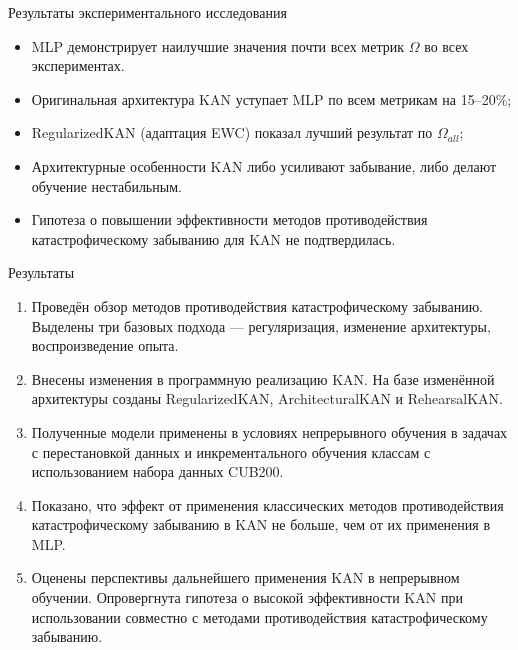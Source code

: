 \documentclass{beamer}
\begin{document}
\begin{frame}{Результаты экспериментального исследования}
  \begin{itemize}
    \item MLP демонстрирует наилучшие значения почти всех метрик $\Omega$ во всех экспериментах.
    \item Оригинальная архитектура KAN уступает MLP по всем метрикам на 15--20\%;
    \item RegularizedKAN (адаптация EWC) показал лучший результат по $\Omega_{all}$;
    \item Архитектурные особенности KAN либо усиливают забывание, либо делают обучение нестабильным.
    \item Гипотеза о повышении эффективности методов противодействия катастрофическому забыванию для KAN не подтвердилась.
  \end{itemize}
\end{frame}


\begin{frame}{Результаты}
  \begin{enumerate}
    \item Проведён обзор методов противодействия катастрофическому забыванию.
        Выделены три базовых подхода — регуляризация, изменение архитектуры, воспроизведение опыта.
    \item Внесены изменения в программную реализацию KAN. На базе изменённой архитектуры
        созданы RegularizedKAN, ArchitecturalKAN и RehearsalKAN.
    \item Полученные модели применены в условиях непрерывного обучения в задачах с перестановкой данных и инкрементального обучения классам с использованием набора данных CUB200.
    \item Показано, что эффект от применения классических методов противодействия
      катастрофическому забыванию в KAN не больше, чем от их применения в MLP.
    \item Оценены перспективы дальнейшего применения KAN в непрерывном обучении.
        Опровергнута гипотеза о высокой эффективности KAN при использовании
        совместно с методами противодействия катастрофическому забыванию.
  \end{enumerate}
\end{frame}
\end{document}
